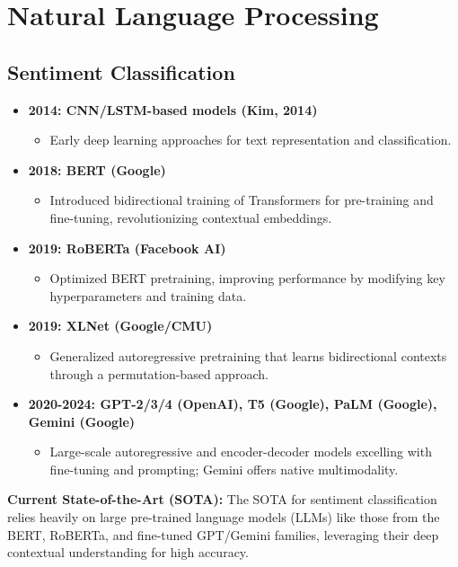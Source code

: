 \documentclass{article}
\begin{document}
\section{Natural Language Processing}

\subsection{Sentiment Classification}
\begin{itemize}[leftmargin=1.5em]
\item \textbf{2014: CNN/LSTM-based models (Kim, 2014)}
  \begin{itemize}
    \item Early deep learning approaches for text representation and classification.
  \end{itemize}
\item \textbf{2018: BERT (Google)}
  \begin{itemize}
    \item Introduced bidirectional training of Transformers for pre-training and fine-tuning, revolutionizing contextual embeddings.
  \end{itemize}
\item \textbf{2019: RoBERTa (Facebook AI)}
  \begin{itemize}
    \item Optimized BERT pretraining, improving performance by modifying key hyperparameters and training data.
  \end{itemize}
\item \textbf{2019: XLNet (Google/CMU)}
  \begin{itemize}
    \item Generalized autoregressive pretraining that learns bidirectional contexts through a permutation-based approach.
  \end{itemize}
\item \textbf{2020-2024: GPT-2/3/4 (OpenAI), T5 (Google), PaLM (Google), Gemini (Google)}
  \begin{itemize}
    \item Large-scale autoregressive and encoder-decoder models excelling with fine-tuning and prompting; Gemini offers native multimodality.
  \end{itemize}
\end{itemize}
\textbf{Current State-of-the-Art (SOTA):} The SOTA for sentiment classification relies heavily on large pre-trained language models (LLMs) like those from the BERT, RoBERTa, and fine-tuned GPT/Gemini families, leveraging their deep contextual understanding for high accuracy.
\end{document}
